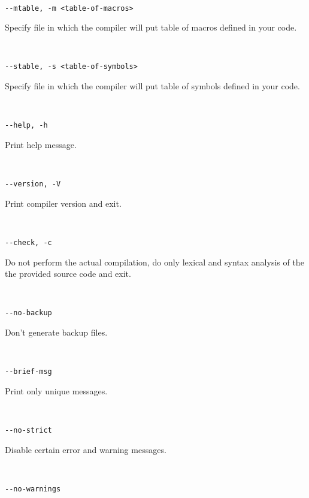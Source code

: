             {
            ~\\
            \usecodefont

            \verb'--mtable, -m <table-of-macros>'\\
            }
            Specify file in which the compiler will put table of macros defined in your code.
            {
            ~\\
            \usecodefont

            \verb'--stable, -s <table-of-symbols>'\\
            }
            Specify file in which the compiler will put table of symbols defined in your code.
            {
            ~\\
            \usecodefont

            \verb'--help, -h'\\
            }
            Print help message.
             {
            ~\\
            \usecodefont

            \verb'--version, -V'\\
            }
            Print compiler version and exit.
             {
            ~\\
            \usecodefont

            \verb'--check, -c'\\
            }
            Do not perform the actual compilation, do only lexical and syntax analysis of the the provided source code and exit.
             {
            ~\\
            \usecodefont

            \verb'--no-backup'\\
            }
            Don't generate backup files.\\
             {
            ~\\
            \usecodefont

            \verb'--brief-msg'\\
            }
            Print only unique messages.
             {
            ~\\
            \usecodefont

            \verb'--no-strict'\\
            }
            Disable certain error and warning messages.
             {
            ~\\
            \usecodefont

            \verb'--no-warnings'\\
            }
